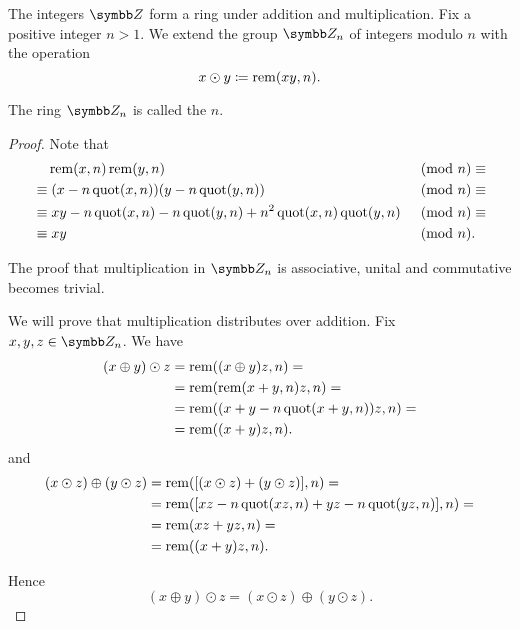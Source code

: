 \begin{definition}\label{def:ring_of_integers_modulo}
  The integers \( \BZ \) form a ring under addition and multiplication. Fix a positive integer \( n > 1 \). We extend the group \( \BZ_n \) of integers modulo \( n \) with the operation
  \begin{equation*}
    x \odot y \coloneqq \operatorname{rem}(xy, n).
  \end{equation*}

  The ring \( \BZ_n \) is called the  \( n \).
\end{definition}
\begin{proof}
  Note that
  \begin{align*}
    &\phantom{\equiv}\; \operatorname{rem}(x, n) \operatorname{rem}(y, n)
    &\pmod n \equiv \\ &\equiv
    (x - n \operatorname{quot}(x, n)) (y - n \operatorname{quot}(y, n))
    &\pmod n \equiv \\ &\equiv
    xy - n \operatorname{quot}(x, n) - n \operatorname{quot}(y, n) + n^2 \operatorname{quot}(x, n) \operatorname{quot}(y, n)
    &\pmod n \equiv \\ &\equiv
    xy
    &\pmod n. \phantom{\equiv}
  \end{align*}

  The proof that multiplication in \( \BZ_n \) is associative, unital and commutative becomes trivial.

  We will prove that multiplication distributes over addition. Fix \( x, y, z \in \BZ_n \). We have
  \begin{align*}
    (x \oplus y) \odot z
    &=
    \operatorname{rem}((x \oplus y) z, n)
    = \\ &=
    \operatorname{rem}(\operatorname{rem}(x + y, n) z, n)
    = \\ &=
    \operatorname{rem}((x + y - n \operatorname{quot}(x + y, n)) z, n)
    = \\ &=
    \operatorname{rem}((x + y)z, n).
  \end{align*}
  and
  \begin{align*}
    (x \odot z) \oplus (y \odot z)
    &=
    \operatorname{rem}([(x \odot z) + (y \odot z)], n)
    = \\ &=
    \operatorname{rem}([xz - n \operatorname{quot}(xz, n) + yz - n \operatorname{quot}(yz, n)], n)
    = \\ &=
    \operatorname{rem}(xz + yz, n)
    = \\ &=
    \operatorname{rem}((x + y)z, n).
  \end{align*}

  Hence
  \begin{equation*}
    (x \oplus y) \odot z = (x \odot z) \oplus (y \odot z).
  \end{equation*}
\end{proof}

